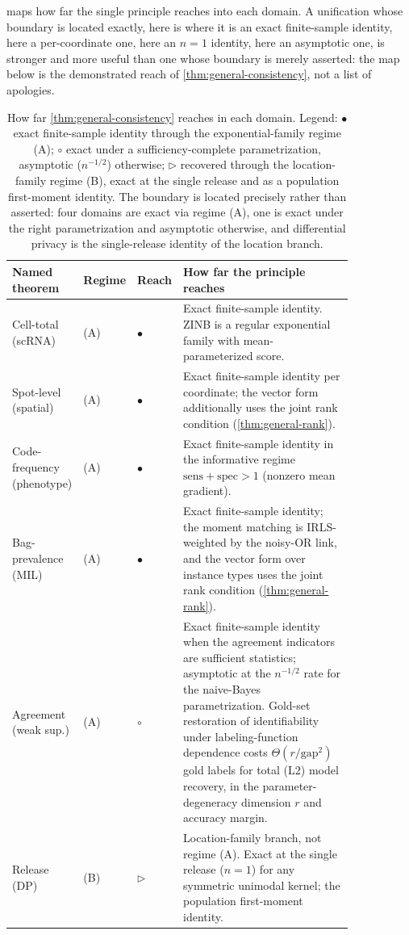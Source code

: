  maps how far the single principle reaches into
each domain. A unification whose boundary is located exactly, here is
where it is an exact finite-sample identity, here a per-coordinate one,
here an $n = 1$ identity, here an asymptotic one, is stronger and more
useful than one whose boundary is merely asserted: the map below is the
demonstrated reach of \cref{thm:general-consistency}, not a list of
apologies.

\begin{table}[tb]
\centering
\small
\begin{tabular}{@{}p{0.20\linewidth} p{0.07\linewidth} p{0.07\linewidth} p{0.50\linewidth}@{}}
\toprule
\textbf{Named theorem} & \textbf{Regime} & \textbf{Reach} & \textbf{How far the principle reaches} \\
\midrule
Cell-total (scRNA) & (A) & $\bullet$ & Exact finite-sample identity. ZINB is a regular exponential family with mean-parameterized score. \\
Spot-level (spatial) & (A) & $\bullet$ & Exact finite-sample identity per coordinate; the vector form additionally uses the joint rank condition (\cref{thm:general-rank}). \\
Code-frequency (phenotype) & (A) & $\bullet$ & Exact finite-sample identity in the informative regime $\mathrm{sens} + \mathrm{spec} > 1$ (nonzero mean gradient). \\
Bag-prevalence (MIL) & (A) & $\bullet$ & Exact finite-sample identity; the moment matching is IRLS-weighted by the noisy-OR link, and the vector form over instance types uses the joint rank condition (\cref{thm:general-rank}). \\
Agreement (weak sup.) & (A) & $\circ$ & Exact finite-sample identity when the agreement indicators are sufficient statistics; asymptotic at the $n^{-1/2}$ rate for the naive-Bayes parametrization. Gold-set restoration of identifiability under labeling-function dependence costs $\Theta(r/\mathrm{gap}^2)$ gold labels for total (L2) model recovery, in the parameter-degeneracy dimension $r$ and accuracy margin. \\
Release (DP) & (B) & $\triangleright$ & Location-family branch, not regime (A). Exact at the single release ($n = 1$) for any symmetric unimodal kernel; the population first-moment identity. \\
\bottomrule
\end{tabular}
\caption{How far \cref{thm:general-consistency} reaches in each domain.
Legend: $\bullet$ exact finite-sample identity through the
exponential-family regime (A); $\circ$ exact under a sufficiency-complete
parametrization, asymptotic ($n^{-1/2}$) otherwise; $\triangleright$
recovered through the location-family regime (B), exact at the single
release and as a population first-moment identity. The boundary is
located precisely rather than asserted: four domains are exact via
regime (A), one is exact under the right parametrization and asymptotic
otherwise, and differential privacy is the single-release identity of
the location branch.}
\label{tab:reduction}
\end{table}
